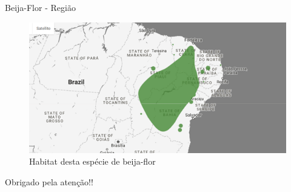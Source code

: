 \documentclass{beamer}
\begin{document}
    \begin{frame}{Beija-Flor - Região}
        \begin{figure}[!h]
          \centering
  	      \includegraphics[scale=1.0]{bf_regiao.png}
          \caption{Habitat desta espécie de beija-flor}
          \label{Rotulo}
        \end{figure}    
    \end{frame}

\begin{frame}
    \Huge{\centerline{Obrigado pela atenção!!}}
\end{frame}
\end{document}
